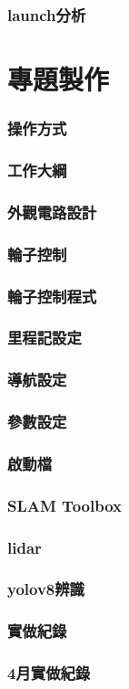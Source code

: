 \documentclass{article}
\begin{document}
\section{launch分析}


\part{專題製作}
\section{操作方式}

\section{工作大綱}

\section{外觀電路設計}



\clearpage
\section{輪子控制}

\section{輪子控制程式}


\section{里程記設定}

\section{導航設定}

\clearpage
\section{參數設定}

\section{啟動檔}

\section{SLAM Toolbox}

\section{lidar}

\section{yolov8辨識}


\section{實做紀錄}

\section{4月實做紀錄}

\end{document}
